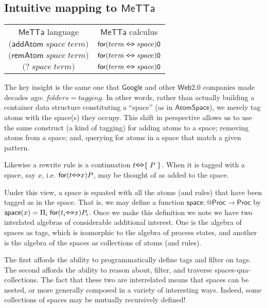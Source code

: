 \subsection{Intuitive mapping to $\mathsf{MeTTa}$}

\begin{center}
\begin{tabular}{ c c }
  $\mathsf{MeTTa}$ language & $\mathsf{MeTTa}$ calculus \\ 
  $\mathsf{(}\mathsf{addAtom}\; space \; term \mathsf{)}$ & $\mathsf{for}( term \;\texttt{<\!-\!>}\; space )\mathsf{0}$ \\
  $\mathsf{(}\mathsf{remAtom}\; space \; term \mathsf{)}$ & $\mathsf{for}( term \;\texttt{<\!-\!>}\; space )\mathsf{0}$ \\
  $\mathsf{(}\mathsf{?}\; space\; term \mathsf{)}$ & $\mathsf{for}( term \;\texttt{<\!-\!>}\; space )\mathsf{0}$ \\  
\end{tabular}
\end{center}

The key insight is the same one that $\mathsf{Google}$ and other
$\mathsf{Web 2.0}$ companies made decades ago: $folders = tagging$. In
other words, rather than actually building a container data structure
constituting a ``space'' (as in $\mathsf{AtomSpace}$), we merely tag
atoms with the space(s) they occupy. This shift in perspective allows
us to use the same construct (a kind of tagging) for adding atoms to a
space; removing atoms from a space; and, querying for atoms in a space
that match a given pattern.

Likewise a rewrite rule is a continuation $t \texttt{<\!-\!>} \mathsf{\{} \;P\;\mathsf{\}}$. When it is tagged with a space, say $x$, i.e. $\mathsf{for}( t \texttt{<\!-\!>} x )P$, may be thought of as added to the space.

Under this view, a space is equated with all the atoms (and rules)
that have been tagged as in the space. That is, we may define a
function $\mathsf{space}:\mathsf{@}\mathsf{Proc} \rightarrow \mathsf{Proc}$ by $\mathsf{space}(x) = \Pi_{i}\;\mathsf{for}( t_{i} \texttt{<\!-\!>} x )P_{i}$. Once we make this definition we note  we have two interlated algebras of considerable additional interest. One is the algebra of spaces as tags, which is isomorphic to the algebra of process states, and another is the algebra of the spaces as collections of atoms (and rules).

The first affords the ability to programmatically define tags and filter on tags. The second affords the ability to reason about, filter, and traverse spaces-qua-collections. The fact that these two are interrelated means that spaces can be nested, or more generally composed in a variety of interesting ways. Indeed, some collections of spaces may be mutually recursively defined!

